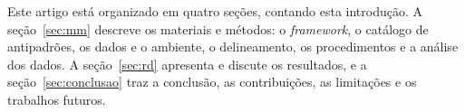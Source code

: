 Este artigo está organizado em quatro seções, contando esta introdução. A seção~\ref{sec:mm} descreve os materiais e métodos: o \textit{framework}, o catálogo de antipadrões, os dados e o ambiente, o delineamento, os procedimentos e a análise dos dados. A seção~\ref{sec:rd} apresenta e discute os resultados, e a seção~\ref{sec:conclusao} traz a conclusão, as contribuições, as limitações e os trabalhos futuros.
